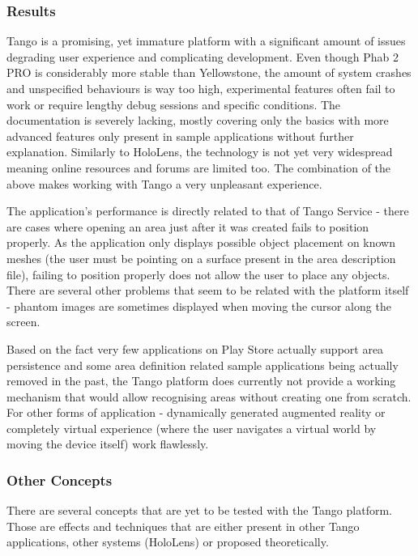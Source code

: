 \documentclass[12pt, a4paper]{article}
\begin{document}
\subsubsection{Results}
Tango is a promising, yet immature platform with a significant amount of issues degrading user experience and complicating development. Even though Phab 2 PRO is considerably more stable than Yellowstone, the amount of system crashes and unspecified behaviours is way too high, experimental features often fail to work or require lengthy debug sessions and specific conditions. The documentation is severely lacking, mostly covering only the basics with more advanced features only present in sample applications without further explanation. Similarly to HoloLens, the technology is not yet very widespread meaning online resources and forums are limited too. The combination of the above makes working with Tango a very unpleasant experience.

The application’s performance is directly related to that of Tango Service - there are cases where opening an area just after it was created fails to position properly. As the application only displays possible object placement on known meshes (the user must be pointing on a surface present in the area description file), failing to position properly does not allow the user to place any objects. There are several other problems that seem to be related with the platform itself - phantom images are sometimes displayed when moving the cursor along the screen.

Based on the fact very few applications on Play Store actually support area persistence and some area definition related sample applications being actually removed in the past, the Tango platform does currently not provide a working mechanism that would allow recognising areas without creating one from scratch. For other forms of application - dynamically generated augmented reality or completely virtual experience (where the user navigates a virtual world by moving the device itself) work flawlessly.

\subsubsection{Other Concepts}
There are several concepts that are yet to be tested with the Tango platform. Those are effects and techniques that are either present in other Tango applications, other systems (HoloLens) or proposed theoretically.
\end{document}
